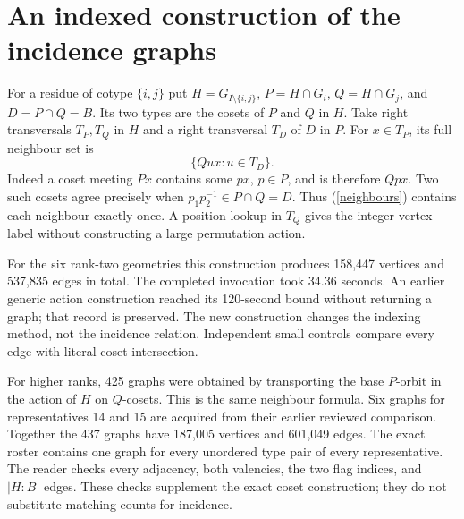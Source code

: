 \documentclass[11pt]{article}
\begin{document}
\section*{An indexed construction of the incidence graphs}
For a residue of cotype $\{i,j\}$ put
$H=G_{I\setminus\{i,j\}}$, $P=H\cap G_i$, $Q=H\cap G_j$,
and $D=P\cap Q=B$. Its two types are the cosets of $P$ and $Q$ in $H$.
Take right transversals $T_P,T_Q$ in $H$ and a right transversal $T_D$
of $D$ in $P$. For $x\in T_P$, its full neighbour set is
\begin{equation}\label{neighbours}
                     \{Qux:u\in T_D\}.
\end{equation}
Indeed a coset meeting $Px$ contains some $px$, $p\in P$, and is
therefore $Qpx$. Two such cosets agree precisely when
$p_1p_2^{-1}\in P\cap Q=D$. Thus (\ref{neighbours}) contains each
neighbour exactly once. A position lookup in $T_Q$ gives the integer
vertex label without constructing a large permutation action.

For the six rank-two geometries this construction produces 158,447
vertices and 537,835 edges in total. The completed invocation took
34.36 seconds. An earlier generic action construction reached its
120-second bound without returning a graph; that record is preserved.
The new construction changes the indexing method, not the incidence
relation. Independent small controls compare every edge with literal
coset intersection.

For higher ranks, 425 graphs were obtained by transporting the base
$P$-orbit in the action of $H$ on $Q$-cosets. This is the same
neighbour formula. Six graphs for representatives 14 and 15 are
acquired from their earlier reviewed comparison. Together the 437
graphs have 187,005 vertices and 601,049 edges. The exact roster
contains one graph for every unordered type pair of every representative.
The reader checks every adjacency, both valencies, the two flag indices,
and $|H:B|$ edges. These checks supplement the exact coset construction;
they do not substitute matching counts for incidence.
\end{document}

